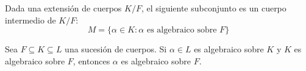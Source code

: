 \begin{proposition}
    Dada una extensión de cuerpos $K/F$, el siguiente subconjunto es un cuerpo intermedio de $K/F$:
    $$M = \{ \alpha \in K : \alpha \text{ es algebraico sobre } F \}$$
\end{proposition}

\begin{proposition}
    Sea $F \subseteq K \subseteq L$ una sucesión de cuerpos. Si $\alpha \in L$ es algebraico sobre $K$ y $K$ es algebraico sobre $F$, entonces $\alpha$ es algebraico sobre $F$.
\end{proposition}
